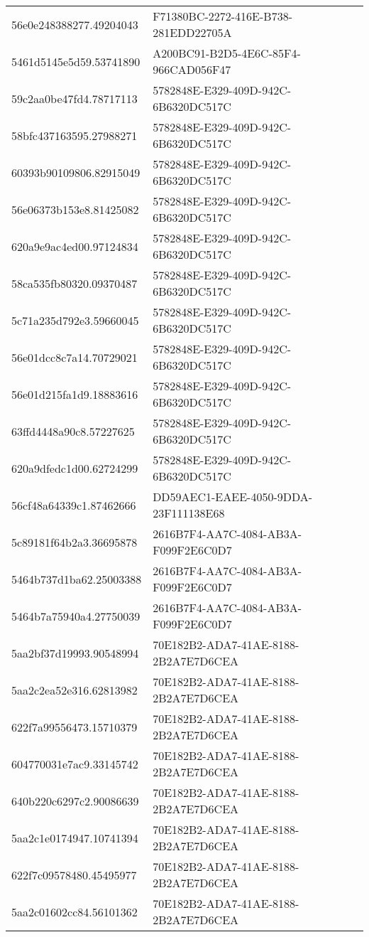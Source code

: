 \begin{tabular}{ll}
56e0e248388277.49204043 & F71380BC-2272-416E-B738-281EDD22705A \\
5461d5145e5d59.53741890 & A200BC91-B2D5-4E6C-85F4-966CAD056F47 \\
59c2aa0be47fd4.78717113 & 5782848E-E329-409D-942C-6B6320DC517C \\
58bfc437163595.27988271 & 5782848E-E329-409D-942C-6B6320DC517C \\
60393b90109806.82915049 & 5782848E-E329-409D-942C-6B6320DC517C \\
56e06373b153e8.81425082 & 5782848E-E329-409D-942C-6B6320DC517C \\
620a9e9ac4ed00.97124834 & 5782848E-E329-409D-942C-6B6320DC517C \\
58ca535fb80320.09370487 & 5782848E-E329-409D-942C-6B6320DC517C \\
5c71a235d792e3.59660045 & 5782848E-E329-409D-942C-6B6320DC517C \\
56e01dcc8c7a14.70729021 & 5782848E-E329-409D-942C-6B6320DC517C \\
56e01d215fa1d9.18883616 & 5782848E-E329-409D-942C-6B6320DC517C \\
63ffd4448a90c8.57227625 & 5782848E-E329-409D-942C-6B6320DC517C \\
620a9dfedc1d00.62724299 & 5782848E-E329-409D-942C-6B6320DC517C \\
56cf48a64339c1.87462666 & DD59AEC1-EAEE-4050-9DDA-23F111138E68 \\
5c89181f64b2a3.36695878 & 2616B7F4-AA7C-4084-AB3A-F099F2E6C0D7 \\
5464b737d1ba62.25003388 & 2616B7F4-AA7C-4084-AB3A-F099F2E6C0D7 \\
5464b7a75940a4.27750039 & 2616B7F4-AA7C-4084-AB3A-F099F2E6C0D7 \\
5aa2bf37d19993.90548994 & 70E182B2-ADA7-41AE-8188-2B2A7E7D6CEA \\
5aa2c2ea52e316.62813982 & 70E182B2-ADA7-41AE-8188-2B2A7E7D6CEA \\
622f7a99556473.15710379 & 70E182B2-ADA7-41AE-8188-2B2A7E7D6CEA \\
604770031e7ac9.33145742 & 70E182B2-ADA7-41AE-8188-2B2A7E7D6CEA \\
640b220c6297c2.90086639 & 70E182B2-ADA7-41AE-8188-2B2A7E7D6CEA \\
5aa2c1e0174947.10741394 & 70E182B2-ADA7-41AE-8188-2B2A7E7D6CEA \\
622f7c09578480.45495977 & 70E182B2-ADA7-41AE-8188-2B2A7E7D6CEA \\
5aa2c01602cc84.56101362 & 70E182B2-ADA7-41AE-8188-2B2A7E7D6CEA \\

\end{tabular}
